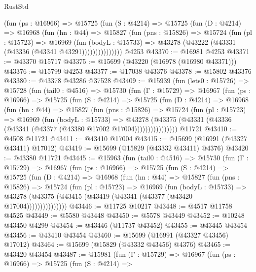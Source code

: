 \begin{lexlean}{RustStd}
\begin{coremodule}
            (fun (ps : @16966) =>
            @15725
              (fun (S : @4214) =>
              @15725
                (fun (D : @4214) =>
                @16968
                  (fun (hn : @44) =>
                  @15827
                    (fun (pns : @15826) =>
                    @15724
                      (fun (pl : @15723) =>
                      @16969
                        (fun (bodyL : @15733) =>
                        @43278 (@43222 (@43331 (@43336 (@43341 @43291)))))))))))))))
    @4253
@43370 := @16981 @4253
@43371 := @43370 @15717
@43375 := @15699 (@43220 (@16978 (@16980 @43371)))
@43376 := @15799 @4253
@43377 := @17038 @43376
@43378 := @15802 @43376
@43380 := @43378 @43286 @37528
@43409 := @15939
    (fun (lets0 : @15726) =>
    @15728
      (fun (tail0 : @4516) =>
      @15730
        (fun (Γ : @15729) =>
        @16967
          (fun (ps : @16966) =>
          @15725
            (fun (S : @4214) =>
            @15725
              (fun (D : @4214) =>
              @16968
                (fun (hn : @44) =>
                @15827
                  (fun (pns : @15826) =>
                  @15724
                    (fun (pl : @15723) =>
                    @16969
                      (fun (bodyL : @15733) =>
                      @43278
                        (@43375
                          (@43331 (@43336 (@43341 (@43377 (@43380 @17002 @17004))))))))))))))))
    @11721
@43410 := @4508 @11721
@43411 := @43410 @17004
@43415 := @15699 (@16991 (@43327 @43411) @17012)
@43419 := @15699 (@15829 (@43332 @43411) @4376)
@43420 := @43380 @11721
@43445 := @15963
    (fun (tail0 : @4516) =>
    @15730
      (fun (Γ : @15729) =>
      @16967
        (fun (ps : @16966) =>
        @15725
          (fun (S : @4214) =>
          @15725
            (fun (D : @4214) =>
            @16968
              (fun (hn : @44) =>
              @15827
                (fun (pns : @15826) =>
                @15724
                  (fun (pl : @15723) =>
                  @16969
                    (fun (bodyL : @15733) =>
                    @43278 (@43375 (@43415 (@43419 (@43341 (@43377 (@43420 @17004)))))))))))))))
@43446 := @11725 @10217
@43448 := @4517 @11758 @4525
@43449 := @5580 @43448
@43450 := @5578 @43449
@43452 := @10248 @43450 @4299
@43454 := @43446 (@11737 @43452)
@43455 := @43445 @43454
@43456 := @43410 @43454
@43460 := @15699 (@16991 (@43327 @43456) @17012)
@43464 := @15699 (@15829 (@43332 @43456) @4376)
@43465 := @43420 @43454
@43487 := @15981
    (fun (Γ : @15729) =>
    @16967
      (fun (ps : @16966) =>
      @15725
        (fun (S : @4214) =>

\end{coremodule}
\end{lexlean}
